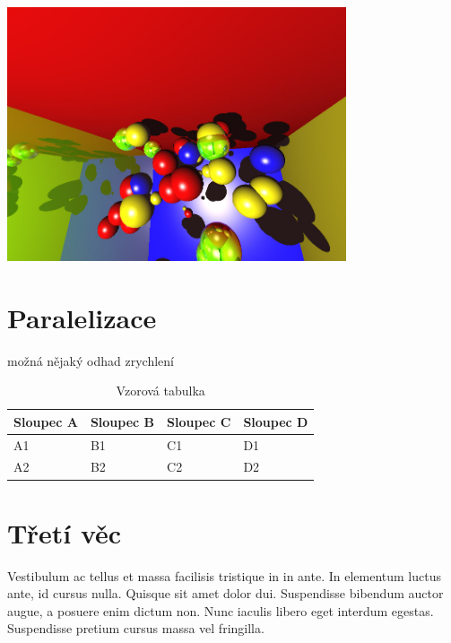 \documentclass[12pt,a4paper,titlepage,final]{report}
\begin{document}
\begin{center}
    \captionsetup{type=figure}
        \includegraphics[width=10cm]{images/sample.jpg}
\end{center}

\section{Paralelizace}

možná nějaký odhad zrychlení

\begin{table}[h!]
    \begin{center}
    \begin{tabular}{ | p{3.5cm} | p{3.5cm} | p{3.5cm} | p{3.5cm} |}
    \hline
    Sloupec A & Sloupec B & Sloupec C & Sloupec D
    \\ \hline

    A1 & B1 & C1 & D1
    \\ \hline

    A2 & B2 & C2 & D2
    \\ \hline

    \end{tabular}
    \end{center}
    \caption{Vzorová tabulka}
\end{table}

\section{Třetí věc}

Vestibulum ac tellus et massa facilisis tristique in in ante. In elementum luctus ante, id cursus nulla. Quisque sit amet dolor dui. Suspendisse bibendum auctor augue, a posuere enim dictum non. Nunc iaculis libero eget interdum egestas. Suspendisse pretium cursus massa vel fringilla.
\end{document}
